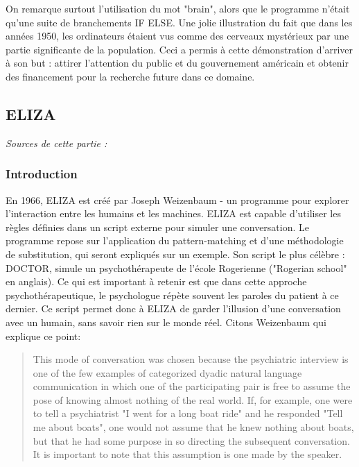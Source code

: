 \documentclass[11pt, a4paper]{report}
\begin{document}
On remarque surtout l'utilisation du mot "brain", alors que le programme n'était qu'une suite 
de branchements IF ELSE. Une jolie illustration du fait que dans les années 1950, les ordinateurs 
étaient vus comme des cerveaux mystérieux par une partie significante de la population. 
Ceci a permis à cette démonstration d'arriver à son but : attirer l'attention du public et du 
gouvernement américain et obtenir des financement pour 
la recherche future dans ce domaine. 
  
    \subsection{ELIZA}
    \textit{Sources de cette partie :} \newline
    \cite[ELIZA (Wikipédia)]{wikipedia-eliza} \newline
    \cite[L'article original de Joseph Weizenbaum sur ELIZA.]{eliza-original} \newline
    \cite[Does GPT-4 pass the Turing test? (étude de UC San Diego)]{eliza-gpt} \newline
    \cite[Computer Power and Human Reason (livre de Weizenbaum)]{weizenbaum-book}

      \subsubsection{Introduction}
En 1966, ELIZA est créé par Joseph Weizenbaum - un programme pour explorer l'interaction entre les humains et 
les machines. ELIZA est capable d'utiliser les règles définies dans un script externe pour 
simuler une conversation. Le programme repose sur l'application du pattern-matching et d'une 
méthodologie de substitution, qui seront expliqués sur un exemple.
Son script le plus célèbre : DOCTOR, simule un psychothérapeute de l'école Rogerienne
("Rogerian school" en anglais). Ce qui est important à retenir est que dans cette approche 
psychothérapeutique, le psychologue répète souvent les paroles du patient à ce dernier. 
Ce script permet donc à ELIZA de garder l'illusion d'une conversation avec un humain, 
sans savoir rien sur le monde réel. Citons Weizenbaum qui explique ce point:

\begin{quote}
  This mode of conversation was chosen because the psychiatric interview is one of the 
  few examples of categorized dyadic natural 
  language communication in which one of the participating pair is free to assume the pose 
  of knowing almost nothing of the real world. If, for example, one were to tell a 
  psychiatrist "I went for a long boat ride" and he responded "Tell me about boats", 
  one would not assume that he knew nothing about boats, but that he had some purpose 
  in so directing the subsequent conversation. It is important to note that this 
  assumption is one made by the speaker. \cite[L'article original de Joseph Weizenbaum
  sur ELIZA]{eliza-original}
\end{quote} 
\end{document}

